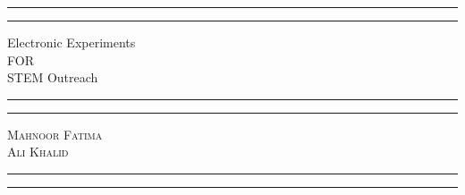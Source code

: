 \begin{titlepage} %
	
	\centering %
	
	
	\rule{\textwidth}{1pt} %
	
	\vspace{2pt}\vspace{-\baselineskip} %
	
	\rule{\textwidth}{0.4pt} %
	
	\vspace{0.1\textheight} %
	
	
		{\Huge Electronic Experiments}\\[0.5\baselineskip] %
		{\Large FOR}\\[0.5\baselineskip] %
		{\Huge STEM Outreach} %
	
	\vspace{0.025\textheight} %
	
	\rule{0.3\textwidth}{0.4pt} %
	
	\vspace{0.1\textheight} %
	
	
	
	
	\vfill %
	
	\rule{0.3\textwidth}{0.4pt} %
		
	{\Large \textsc{Mahnoor Fatima\\ Ali Khalid\\ }}
	\vspace{0.015\textheight} %
	\vspace{0.05\textheight}
	
	\rule{\textwidth}{0.4pt} %
	
	\vspace{2pt}\vspace{-\baselineskip} %
	
	\rule{\textwidth}{1pt} %
	
\end{titlepage}
